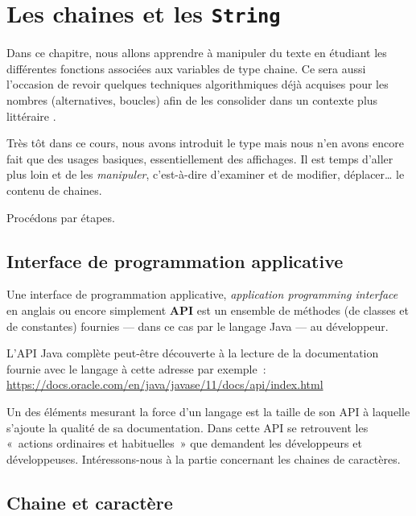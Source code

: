 \chapter{Les chaines et les \texttt{String}}

	Dans ce chapitre, nous allons apprendre à manipuler du texte en étudiant les
	différentes fonctions associées aux variables de type chaine.  Ce sera aussi
	l’occasion de revoir quelques techniques algorithmiques déjà acquises pour
	les nombres (alternatives, boucles) afin de les consolider dans un contexte
	plus \og littéraire \fg.

	
	Très tôt dans ce cours, nous avons introduit le type  mais nous
	n’en avons encore fait que des usages basiques, essentiellement des
	affichages.  Il est temps d’aller plus loin et de les \emph{manipuler},
	c’est-à-dire d’examiner et de modifier, déplacer… le contenu de chaines.
	
	Procédons par étapes.
	
	\minitoc

	\clearpage


\section{Interface de programmation applicative}
\label{chap:api}

Une interface de programmation applicative, \textit{application programming
interface} en anglais ou encore simplement \textbf{API} est un ensemble de
méthodes (de classes et de constantes) fournies — dans ce cas par le langage
Java — au développeur.

L'API Java complète peut-être découverte à la lecture de la documentation
fournie avec le langage à cette adresse par exemple~:
\url{https://docs.oracle.com/en/java/javase/11/docs/api/index.html}~\cite{javadoc}

Un des éléments mesurant la force d'un langage est la taille de son API
à laquelle s'ajoute la qualité de sa documentation. Dans cette API se
retrouvent les «~actions ordinaires et habituelles~» que demandent les
développeurs et développeuses. Intéressons-nous à la partie concernant les
chaines de caractères. 

\section{Chaine et caractère}


